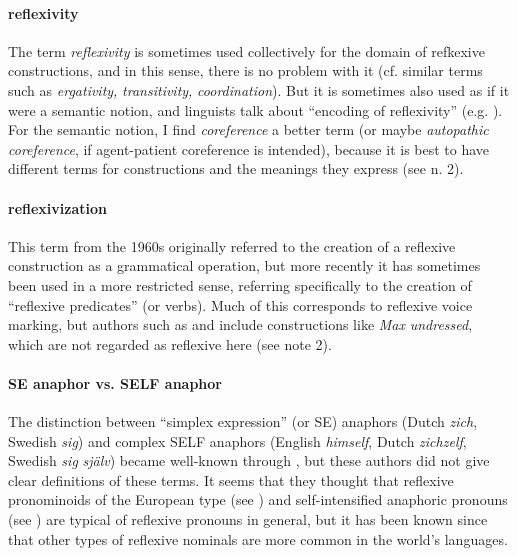 \documentclass[output=paper]{langscibook}
\begin{document}
\paragraph*{reflexivity} The term \textit{reflexivity} is sometimes used collectively for the domain of refkexive constructions, and in this sense, there is no problem with it (cf. similar terms such as \textit{ergativity,} \textit{transitivity,} \textit{coordination}). But it is sometimes also used as if it were a semantic notion, and linguists talk about “encoding of reflexivity” (e.g. \citealt[63]{DéchaineWiltschko2017a}). For the semantic notion, I find \textit{coreference} a better term (or maybe \textit{autopathic} \textit{coreference}, if agent-patient coreference is intended), because it is best to have different terms for constructions and the meanings they express (see n. 2).

\paragraph*{reflexivization} This term from the 1960s originally referred to the creation of a reflexive construction as a grammatical operation, but more recently it has sometimes been used in a more restricted sense, referring specifically to the creation of “reflexive predicates” (or verbs). Much of this corresponds to reflexive voice marking, but authors such as \citet[399]{Reinhart2005} and \citet[197]{Everaert2013} include constructions like \textit{Max} \textit{undressed}, which are not regarded as reflexive here (see note 2).

\paragraph*{SE anaphor vs. SELF anaphor} The distinction between “simplex expression” (or SE) anaphors (Dutch \textit{zich}, Swedish \textit{sig}) and complex SELF anaphors (English \textit{himself}, Dutch \textit{zichzelf}, Swedish \textit{sig} \textit{själv}) became well-known through \citet{Reinhart1993}, but these authors did not give clear definitions of these terms. It seems that they thought that reflexive pronominoids of the European type (see ) and self-intensified anaphoric pronouns (see ) are typical of reflexive pronouns in general, but it has been known since \citet{Faltz1977} that other types of reflexive nominals are more common in the world’s languages.

{\sloppy\printbibliography[heading=subbibliography,notkeyword=this]}
\end{document}
